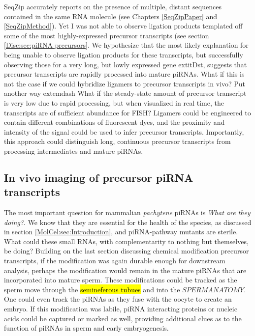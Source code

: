 
    
    SeqZip accurately reports on the presence of multiple, distant sequences contained in the same RNA molecule (see Chapters \ref{SeqZipPaper} and \ref{SeqZipMethod}). Yet I was not able to observe ligation products templated off some of the most highly-expressed precursor transcripts (see section \ref{Disc:sec:piRNA precursors}. We hypothesize that the most likely explanation for being unable to observe ligation products for these transcripts, but successfully observing those for a very long, but lowly expressed gene   extit{Dst}, suggests that precursor transcripts are rapidly processed into mature piRNAs. What if this is not the case if we could hybridize ligamers to precursor transcripts in vivo? Put another way  extemdash What if the steady-state amount of precursor transcript is very low due to rapid processing, but when visualized in real time, the transcripts are of sufficient abundance for FISH? Ligamers could be engineered to contain different combinations of fluorescent dyes, and the proximity and intensity of the signal could be used to infer precursor transcripts. Importantly, this approach could distinguish long, continuous precursor transcripts from processing intermediates and mature piRNAs.

  \subsection{In vivo imaging of precursor piRNA transcripts}\label{Disc:subsec:Imaging of precursors}

    The most important question for mammalian \textit{pachytene} piRNAs is \textit{What are they doing?}. We know that they are essential for the health of the species, as discussed in section \ref{MolCel:sec:Introduction}, and piRNA-pathway mutants are sterile. What could these small RNAs, with complementarity to nothing but themselves, be doing? Building on the last section discussing chemical modification precursor transcripts, if the modification was again durable enough for downstream analysis, perhaps the modification would remain in the mature piRNAs that are incorporated into mature sperm. These modifications could be tracked as the sperm move through the \hl{semineferous tubues} and into the $SPERM ANATOMY$. One could even track the piRNAs as they fuse with the oocyte to create an embryo. If this modification was labile, piRNA interacting proteins or nucleic acids could be captured or marked as well, providing additional clues as to the function of piRNAs in sperm and early embryogenesis.

